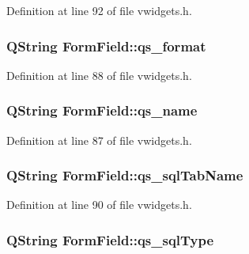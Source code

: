 Definition at line 92 of file vwidgets.h.

\hypertarget{classFormField_ac8f496b75a15cf55a93c5bbd0cd3c037}{
\subsubsection[{qs\_\-format}]{\setlength{\rightskip}{0pt plus 5cm}QString {\bf FormField::qs\_\-format}}}
\label{classFormField_ac8f496b75a15cf55a93c5bbd0cd3c037}


Definition at line 88 of file vwidgets.h.

\hypertarget{classFormField_a7678a3e5f30d707b47b4b1a23a9bd80d}{
\subsubsection[{qs\_\-name}]{\setlength{\rightskip}{0pt plus 5cm}QString {\bf FormField::qs\_\-name}}}
\label{classFormField_a7678a3e5f30d707b47b4b1a23a9bd80d}


Definition at line 87 of file vwidgets.h.

\hypertarget{classFormField_a525f52fa7e6e96ee123d77eb1e81ab1f}{
\subsubsection[{qs\_\-sqlTabName}]{\setlength{\rightskip}{0pt plus 5cm}QString {\bf FormField::qs\_\-sqlTabName}}}
\label{classFormField_a525f52fa7e6e96ee123d77eb1e81ab1f}


Definition at line 90 of file vwidgets.h.

\hypertarget{classFormField_a64e90014c3119fd3981be4fcceacf361}{
\subsubsection[{qs\_\-sqlType}]{\setlength{\rightskip}{0pt plus 5cm}QString {\bf FormField::qs\_\-sqlType}}}
\label{classFormField_a64e90014c3119fd3981be4fcceacf361}


